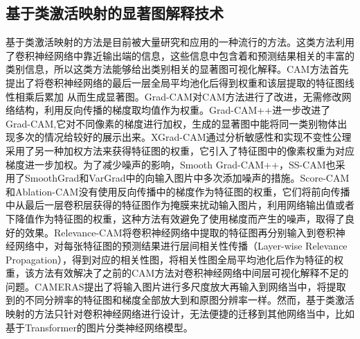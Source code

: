 \subsection{基于类激活映射的显著图解释技术}
基于类激活映射的方法是目前被大量研究和应用的一种流行的方法。这类方法利用了卷积神经网络中靠近输出端的信息，这些信息中包含着和预测结果相关的丰富的类别信息，所以这类方法能够给出类别相关的显著图可视化解释。CAM\textsuperscript{\cite{zhou2016learning}}方法首先提出了将卷积神经网络的最后一层全局平均池化后得到权重和该层提取的特征图线性相乘后累加  从而生成显著图。Grad-CAM\textsuperscript{\cite{selvaraju2017grad}}对CAM方法进行了改进，无需修改网络结构，利用反向传播的梯度取均值作为权重。Grad-CAM++\textsuperscript{\cite{chattopadhay2018grad}}进一步改进了Grad-CAM,它对不同像素的梯度进行加权，生成的显著图中能将同一类别物体出现多次的情况给较好的展示出来。XGrad-CAM\textsuperscript{\cite{fu2020axiom}}通过分析敏感性和实现不变性公理采用了另一种加权方法来获得特征图的权重，它引入了特征图中的像素权重为对应梯度进一步加权。为了减少噪声的影响，Smooth Grad-CAM++\textsuperscript{\cite{omeiza2019smooth}}，SS-CAM\textsuperscript{\cite{wang2020ss}}也采用了SmoothGrad\textsuperscript{\cite{smilkov2017smoothgrad}}和VarGrad\textsuperscript{\cite{adebayo2018sanity}}中的向输入图片中多次添加噪声的措施。Score-CAM\textsuperscript{\cite{wang2020score}}和Ablation-CAM\textsuperscript{\cite{ramaswamy2020ablation}}没有使用反向传播中的梯度作为特征图的权重，它们将前向传播中从最后一层卷积层获得的特征图作为掩膜来扰动输入图片，利用网络输出值或者下降值作为特征图的权重，这种方法有效避免了使用梯度而产生的噪声，取得了良好的效果。Relevance-CAM\textsuperscript{\cite{lee2021relevance}}将卷积神经网络中提取的特征图再分别输入到卷积神经网络中，对每张特征图的预测结果进行层间相关性传播（Layer-wise Relevance Propagation），得到对应的相关性图，将相关性图全局平均池化后作为特征的权重，该方法有效解决了之前的CAM方法对卷积神经网络中间层可视化解释不足的问题。CAMERAS\textsuperscript{\cite{jalwana2021cameras}}提出了将输入图片进行多尺度放大再输入到网络当中，将提取到的不同分辨率的特征图和梯度全部放大到和原图分辨率一样。然而，基于类激活映射的方法只针对卷积神经网络进行设计，无法便捷的迁移到其他网络当中，比如基于Transformer的图片分类神经网络模型。


